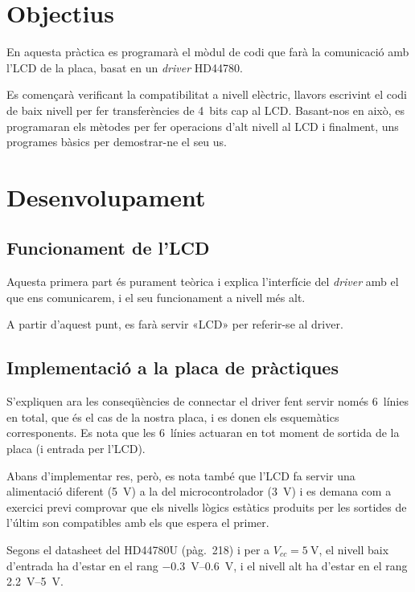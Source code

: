 
\section{Objectius}

En aquesta pràctica es programarà el mòdul de codi que farà la comunicació
amb l'LCD de la placa, basat en un \emph{driver} HD44780.

Es començarà verificant la compatibilitat a nivell elèctric, llavors
escrivint el codi de baix nivell per fer transferències de 4~bits cap
al LCD. Basant-nos en això, es programaran els mètodes per fer operacions
d'alt nivell al LCD i finalment, uns programes bàsics per demostrar-ne el
seu us.

\section{Desenvolupament}


\subsection{Funcionament de l'LCD}

Aquesta primera part és purament teòrica i explica l'interfície del \emph{driver}
amb el que ens comunicarem, i el seu funcionament a nivell més alt.

A partir d'aquest punt, es farà servir «LCD» per referir-se al driver.


\subsection{Implementació a la placa de pràctiques}

S'expliquen ara les conseqüències de connectar el driver fent servir només 6~línies
en total, que és el cas de la nostra placa, i es donen els esquemàtics corresponents.
Es nota que les 6~línies actuaran en tot moment de sortida de la placa (i entrada
per l'LCD).

Abans d'implementar res, però, es nota també que l'LCD fa servir una alimentació
diferent (\SI{5}{\volt}) a la del microcontrolador (\SI{3}{\volt}) i es demana com
a exercici previ comprovar que els nivells lògics estàtics produits per les
sortides de l'últim son compatibles amb els que espera el primer.

Segons el datasheet del HD44780U (pàg.~218) i per a \(V_{cc} = \SI{5}{\volt}\),
el nivell baix d'entrada ha d'estar en el rang \SIrange{-0.3}{0.6}{\volt}, i el nivell
alt ha d'estar en el rang \SIrange{2.2}{5}{\volt}.

